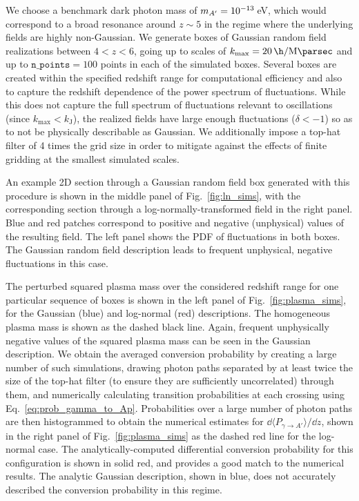 \documentclass[prd,aps,10pt,nofootinbib,twocolumn,superscriptaddress,preprintnumbers,balancelastpage,longbibliography]{revtex4-1}
\begin{document}
We choose a benchmark dark photon mass of $m_{A^\prime} = 10^{-13}$\,eV, which would correspond to a broad resonance around $z \sim 5$ in the regime where the underlying fields are highly non-Gaussian. We generate boxes of Gaussian random field realizations between $4 < z < 6$, going up to scales of $k_\mathrm{max} = \SI{20}{\h\per\mega\parsec}$ and up to $\texttt{n\_points}=100$ points in each of the simulated boxes. Several boxes are created within the specified redshift range for computational efficiency and also to capture the redshift dependence of the power spectrum of fluctuations. While this does not capture the full spectrum of fluctuations relevant to oscillations (since $k_\mathrm{max} < k_\mathrm{J}$), the realized fields have large enough fluctuations ($\delta < -1$) so as to not be physically describable as Gaussian. We additionally impose a top-hat filter of 4 times the grid size in order to mitigate against the effects of finite gridding at the smallest simulated scales. 

An example 2D section through a Gaussian random field box generated with this procedure is shown in the middle panel of Fig.~\ref{fig:ln_sims}, with the corresponding section through a log-normally-transformed field in the right panel. Blue and red patches correspond to positive and negative (unphysical) values of the resulting field. The left panel shows the PDF of fluctuations in both boxes. The Gaussian random field description leads to frequent unphysical, negative fluctuations in this case.

The perturbed squared plasma mass over the considered redshift range for one particular sequence of boxes is shown in the left panel of Fig.~\ref{fig:plasma_sims}, for the Gaussian (blue) and log-normal (red) descriptions. The homogeneous plasma mass is shown as the dashed black line. Again, frequent unphysically negative values of the squared plasma mass can be seen in the Gaussian description. We obtain the averaged conversion probability by creating a large number of such simulations, drawing photon paths separated by at least twice the size of the top-hat filter (to ensure they are sufficiently uncorrelated) through them, and numerically calculating transition probabilities at each crossing using Eq.~\eqref{eq:prob_gamma_to_Ap}. Probabilities over a large number of photon paths are then histogrammed to obtain the numerical estimates for $\dd \langle P_{\gamma \to A'} \rangle/\dd z$, shown in the right panel of Fig.~\ref{fig:plasma_sims} as the dashed red line for the log-normal case. The analytically-computed differential conversion probability for this configuration is shown in solid red, and provides a good match to the numerical results. The analytic Gaussian description, shown in blue, does not accurately described the conversion probability in this regime. 
\end{document}
